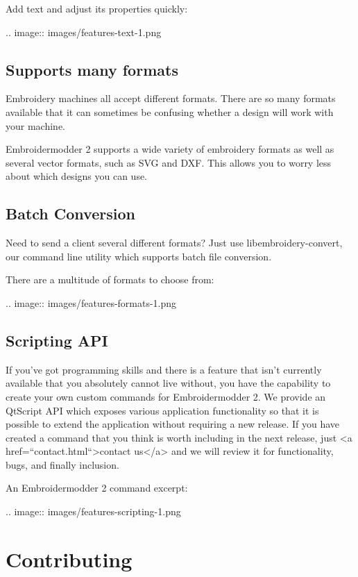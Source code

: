 \documentclass[10pt]{report}
\begin{document}
Add text and adjust its properties quickly:

.. image::
   images/features-text-1.png

\subsection{Supports many formats}

Embroidery machines all accept different formats. There are so many formats available that it can sometimes be confusing whether a design will work with your machine.

Embroidermodder 2 supports a wide variety of embroidery formats as well as several vector formats, such as SVG and DXF. This allows you to worry less about which designs you can use.

\subsection{Batch Conversion}

Need to send a client several different formats? Just use libembroidery-convert, our command line utility which supports batch file conversion.

There are a multitude of formats to choose from:

.. image::
   images/features-formats-1.png

\subsection{Scripting API}

If you've got programming skills and there is a feature that isn't currently available that you absolutely cannot live without, you have the capability to create your own custom commands for Embroidermodder 2. We provide an QtScript API which exposes various application functionality so that it is possible to extend the application without requiring a new release. If you have created a command that you think is worth including in the next release, just <a href=``contact.html``>contact us</a> and we will review it for functionality, bugs, and finally inclusion.

An Embroidermodder 2 command excerpt:

.. image::
   images/features-scripting-1.png

\section{Contributing}
\end{document}
